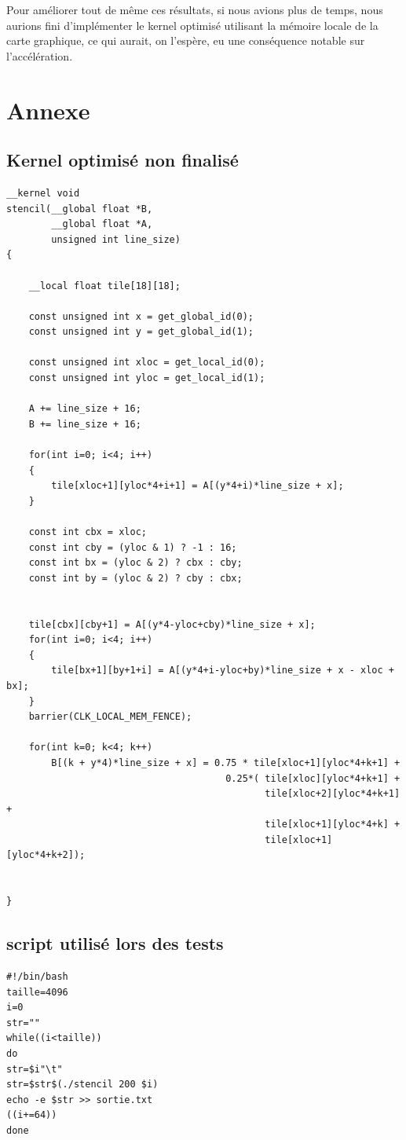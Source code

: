 \documentclass{article}
\begin{document}
Pour améliorer tout de même ces résultats, si nous avions plus de temps, nous aurions fini d'implémenter le kernel optimisé utilisant la mémoire locale de la carte graphique, ce qui aurait, on l'espère, eu une conséquence notable sur l'accélération.

\clearpage
\section*{Annexe}
\subsection{Kernel optimisé non finalisé}
\label{kernel}
\begin{verbatim}
__kernel void
stencil(__global float *B,
        __global float *A,
        unsigned int line_size)
{

    __local float tile[18][18];

    const unsigned int x = get_global_id(0);
    const unsigned int y = get_global_id(1);

    const unsigned int xloc = get_local_id(0);
    const unsigned int yloc = get_local_id(1);

    A += line_size + 16;
    B += line_size + 16;

    for(int i=0; i<4; i++)
    {
        tile[xloc+1][yloc*4+i+1] = A[(y*4+i)*line_size + x];
    }

    const int cbx = xloc;
    const int cby = (yloc & 1) ? -1 : 16;
    const int bx = (yloc & 2) ? cbx : cby;
    const int by = (yloc & 2) ? cby : cbx;


    tile[cbx][cby+1] = A[(y*4-yloc+cby)*line_size + x];
    for(int i=0; i<4; i++)
    {
        tile[bx+1][by+1+i] = A[(y*4+i-yloc+by)*line_size + x - xloc + bx];
    }
    barrier(CLK_LOCAL_MEM_FENCE);

    for(int k=0; k<4; k++)
        B[(k + y*4)*line_size + x] = 0.75 * tile[xloc+1][yloc*4+k+1] +
                                       0.25*( tile[xloc][yloc*4+k+1] +
                                              tile[xloc+2][yloc*4+k+1] +
                                              tile[xloc+1][yloc*4+k] +
                                              tile[xloc+1][yloc*4+k+2]);


}
\end{verbatim}

\subsection{script utilisé lors des tests}
\label{script}
\begin{verbatim}
#!/bin/bash
taille=4096
i=0
str=""
while((i<taille))
do
str=$i"\t"
str=$str$(./stencil 200 $i)
echo -e $str >> sortie.txt
((i+=64))
done
\end{verbatim}
\end{document}
